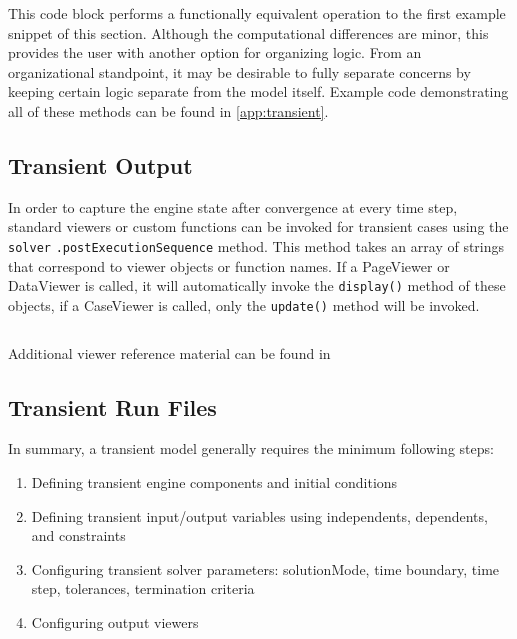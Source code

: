 \documentclass[heading.tex]{subfiles}
\begin{document}
This code block performs a functionally equivalent operation to the first example snippet of this section.
Although the computational differences are minor, this provides the user with another option for organizing logic.
From an organizational standpoint,
it may be desirable to fully separate concerns by keeping certain logic separate from the model itself.
Example code demonstrating all of these methods can be found in \cref{app:transient}.

\subsection{Transient Output}

In order to capture the engine state after convergence at every time step, standard viewers or custom functions can be
invoked for transient cases using the \texttt{solver} \texttt{.postExecutionSequence} method. This method takes an array of strings that
correspond to viewer objects or function names. If a PageViewer or DataViewer is called, it will automatically invoke the
\texttt{display()} method of these objects, if a CaseViewer is called, only the \texttt{update()} method will be invoked.

 \begin{adjustwidth}{-1cm}{-1cm}
 \inputminted[]{c++}{code/transient1}
 \end{adjustwidth} 

Additional viewer reference material can be found in \cite[chap.~7.2.2, ~12, ~15.3.1]{NPSS}

\subsection{Transient Run Files}

In summary, a transient model generally requires the minimum following steps:

\begin{enumerate}
\item Defining transient engine components and initial conditions
\item Defining transient input/output variables using independents, dependents, and constraints
\item Configuring transient solver parameters: solutionMode, time boundary, time step, tolerances, termination criteria
\item Configuring output viewers
\end{enumerate}
\end{document}
